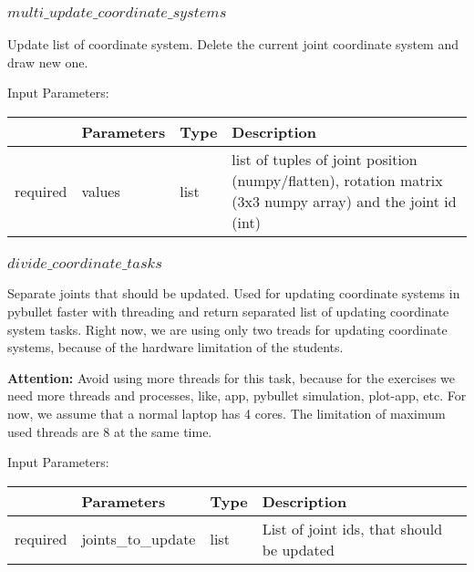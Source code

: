\documentclass[
	ngerman,
	accentcolor=9c,%
	type=intern,
	marginpar=false
	]{tudapub}
\begin{document}
\subsubsection{$multi\_update\_coordinate\_systems$}
\noindent Update list of coordinate system. Delete the current joint coordinate system and draw new one.

\vspace{0.5cm}
\noindent Input Parameters:
\vspace{0.5cm}

\begin{tabular}{|p{}|p{}|p{}| p{}|}
\hline
 & \textbf{Parameters} & \textbf{Type} & \textbf{Description} \\
\hline
required & values & list & list of tuples of joint position (numpy/flatten), rotation matrix (3x3 numpy array) and the joint id (int) \\
\hline
\end{tabular}
\vspace{1cm}


\subsubsection{$divide\_coordinate\_tasks$}
\noindent Separate joints that should be updated. Used for updating coordinate systems in pybullet faster with threading and return separated list of updating coordinate system tasks. Right now, we are using only two treads for updating coordinate systems, because of the hardware limitation of the students.

\vspace{0.2cm}

\noindent \textbf{Attention: } Avoid using more threads for this task, because for the exercises we need more threads and processes, like, app, pybullet simulation, plot-app, etc. For now, we assume that a normal laptop has 4 cores. The limitation of maximum used threads are 8 at the same time.

\vspace{0.5cm}
\noindent Input Parameters:
\vspace{0.5cm}

\begin{tabular}{|p{}|p{}|p{}| p{}|}
\hline
 & \textbf{Parameters} & \textbf{Type} & \textbf{Description} \\
\hline
required & joints\_to\_update & list & List of joint ids, that should be updated \\
\hline
\end{tabular}
\vspace{1cm}
\end{document}
